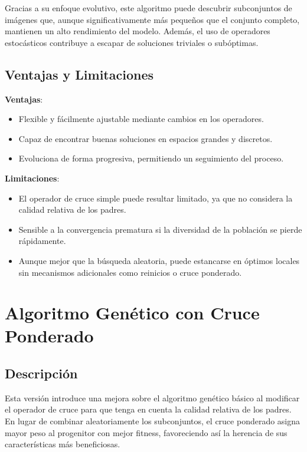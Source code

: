 Gracias a su enfoque evolutivo, este algoritmo puede descubrir subconjuntos de imágenes que,
aunque significativamente más pequeños que el conjunto completo, mantienen un alto rendimiento del modelo.
Además, el uso de operadores estocásticos contribuye a escapar de soluciones triviales o subóptimas.

\subsection{Ventajas y Limitaciones}\label{subsec:ventajas-y-limitaciones-genetico-v1}
\textbf{Ventajas}:
\begin{itemize}
      \item Flexible y fácilmente ajustable mediante cambios en los operadores.
      \item Capaz de encontrar buenas soluciones en espacios grandes y discretos.
      \item Evoluciona de forma progresiva, permitiendo un seguimiento del proceso.
\end{itemize}

\textbf{Limitaciones}:
\begin{itemize}
      \item El operador de cruce simple puede resultar limitado, ya que no considera la calidad relativa de los padres.
      \item Sensible a la convergencia prematura si la diversidad de la población se pierde rápidamente.
      \item Aunque mejor que la búsqueda aleatoria, puede estancarse en óptimos locales sin mecanismos adicionales como reinicios o cruce ponderado.
\end{itemize}

\section{Algoritmo Genético con Cruce Ponderado}\label{sec:genetico-v2}
\subsection{Descripción}\label{subsec:descripcion-genetico-v2}
Esta versión introduce una mejora sobre el algoritmo genético básico al modificar el operador de cruce para que
tenga en cuenta la calidad relativa de los padres.
En lugar de combinar aleatoriamente los subconjuntos, el cruce ponderado asigna mayor peso al progenitor con mejor fitness,
favoreciendo así la herencia de sus características más beneficiosas.

